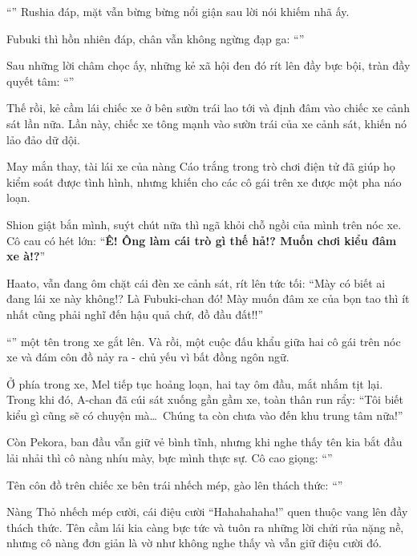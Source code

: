 \documentclass[../main.tex]{subfiles}
\begin{document}
``'' Rushia đáp, mặt vẫn bừng bừng nổi giận sau lời nói khiếm nhã ấy.

Fubuki thì hồn nhiên đáp, chân vẫn không ngừng đạp ga: ``''

Sau những lời châm chọc ấy, những kẻ xã hội đen đó rít lên đầy bực bội, tràn đầy quyết tâm: ``''

Thế rồi, kẻ cầm lái chiếc xe ở bên sườn trái lao tới và định đâm vào chiếc xe cảnh sát lần nữa. Lần này, chiếc xe tông mạnh vào sườn trái của xe cảnh sát, khiến nó lảo đảo dữ dội.

May mắn thay, tài lái xe của nàng Cáo trắng trong trò chơi điện tử đã giúp họ kiểm soát được tình hình, nhưng khiến cho các cô gái trên xe được một pha náo loạn.

Shion giật bắn mình, suýt chút nữa thì ngã khỏi chỗ ngồi của mình trên nóc xe. Cô cau có hét lớn: ``\textbf{Ê! Ông làm cái trò gì thế hả!? Muốn chơi kiểu đâm xe à!?}''

Haato, vẫn đang ôm chặt cái đèn xe cảnh sát, rít lên tức tối: ``Mày có biết ai đang lái xe này không!? Là Fubuki-chan đó! Mày muốn đâm xe của bọn tao thì ít nhất cũng phải nghĩ đến hậu quả chứ, đồ đầu đất!!''

``'' một tên trong xe gắt lên. Và rồi, một cuộc đấu khẩu giữa hai cô gái trên nóc xe và đám côn đồ nảy ra - chủ yếu vì bất đồng ngôn ngữ.

Ở phía trong xe, Mel tiếp tục hoảng loạn, hai tay ôm đầu, mắt nhắm tịt lại. Trong khi đó, A-chan đã cúi sát xuống gần gầm xe, toàn thân run rẩy: ``Tôi biết kiểu gì cũng sẽ có chuyện mà\dots\ Chúng ta còn chưa vào đến khu trung tâm nữa!''

Còn Pekora, ban đầu vẫn giữ vẻ bình tĩnh, nhưng khi nghe thấy tên kia bắt đầu lải nhải thì cô nàng nhíu mày, bực mình thực sự. Cô cao giọng: ``''

Tên côn đồ trên chiếc xe bên trái nhếch mép, gào lên thách thức: ``''

Nàng Thỏ nhếch mép cười, cái điệu cười ``Ha\downarrow ha\uparrow ha\uparrow ha\uparrow ha\uparrow!'' quen thuộc vang lên đầy thách thức. Tên cầm lái kia càng bực tức và tuôn ra những lời chửi rủa nặng nề, nhưng cô nàng đơn giản là vờ như không nghe thấy và vẫn giữ điệu cười đó.
\end{document}
